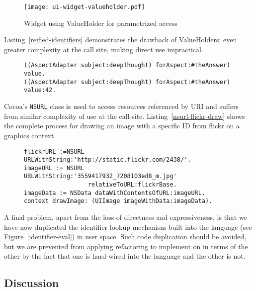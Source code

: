 \documentclass[preprint,authoryear]{llncs}
\begin{document}
\begin{figure}[htbp]
\centering
\texttt{[image: ui-widget-valueholder.pdf]}
\caption{Widget using ValueHolder for parametrized access}
\label{ui-widget-valueholder}

\end{figure}

Listing~\ref{reified-identifiers} demonstrates the drawback of ValueHolders:  even greater complexity at the
call site, making direct use impractical. 


\begin{figure}[htbp]
\begin{lstlisting}[style=numbers,label=reified-identifiers,caption=Retrieve and store value via AspectAdaptor ValueHolder.]
((AspectAdapter subject:deepThought) forAspect:#theAnswer) value.
((AspectAdapter subject:deepThought) forAspect:#theAnswer) value:42.
\end{lstlisting}
\end{figure}

Cocoa's {\tt NSURL} class is used to access resources referenced by URI and suffers from similar complexity
of use at the call-site.  Listing~\ref{nsurl-flickr-draw}
shows the complete process for drawing an image with a specific ID from flickr on a graphics context.

\begin{figure}[htbp]
\begin{lstlisting}[style=numbers,label=nsurl-flickr-draw,caption=Retrieving and drawing an image stored on flickr.com.]
flickrURL :=NSURL URLWithString:'http://static.flickr.com/2438/'.
imageURL := NSURL URLWithString:'3559417932_7208103ed8_m.jpg'
                  relativeToURL:flickrBase.
imageData := NSData dataWithContentsOfURL:imageURL.
context drawImage: (UIImage imageWithData:imageData).
\end{lstlisting}
\end{figure}


A final problem, apart from the loss of directness and expressiveness, is that we have now 
duplicated the identifier lookup mechanism built into the language (see Figure~\ref{identifier-eval})
in user space.  Such code duplication should be avoided, but we are prevented from applying refactoring
to implement on in terms of the other by the fact that one is hard-wired into the language and the other is not.

\subsection{Discussion}
\end{document}
